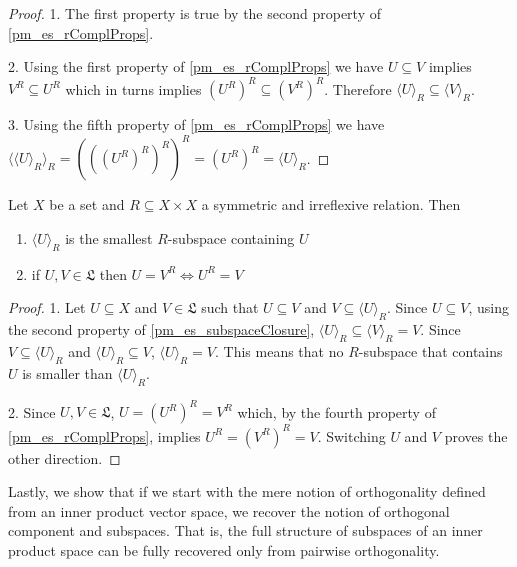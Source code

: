 \begin{mathSection}
	\begin{proof}
		1. The first property is true by the second property of \ref{pm_es_rComplProps}.
		
		2. Using the first property of \ref{pm_es_rComplProps} we have $U \subseteq V$ implies $V^{R} \subseteq U^{R}$ which in turns implies $(U^{R})^{R} \subseteq (V^{R})^{R}$. Therefore $\langle U \rangle_R \subseteq \langle V \rangle_R$.
		
		3. Using the fifth property of \ref{pm_es_rComplProps} we have $\langle \langle U \rangle_R \rangle_R = (((U^{R})^{R})^{R})^{R} = (U^{R})^{R} = \langle U \rangle_R$.
	\end{proof}
	
	\begin{prop}
		Let $X$ be a set and $R \subseteq X \times X$ a symmetric and irreflexive relation. Then
		\begin{enumerate}
			\item $\langle U \rangle_R$ is the smallest $R$-subspace containing $U$
			\item if $U, V \in \mathfrak{L}$ then $U = V^{R} \iff U^{R} = V$
		\end{enumerate}
	\end{prop}
	
	\begin{proof}
		1. Let $U \subseteq X$ and $V \in \mathfrak{L}$ such that $U \subseteq V$ and $V \subseteq \langle U \rangle_R$. Since $U \subseteq V$, using the second property of \ref{pm_es_subspaceClosure}, $\langle U \rangle_R \subseteq \langle V \rangle_R = V$. Since $V \subseteq \langle U \rangle_R$ and  $\langle U \rangle_R \subseteq  V$, $\langle U \rangle_R = V$. This means that no $R$-subspace that contains $U$ is smaller than $\langle U \rangle_R$.
		
		2. Since $U, V \in \mathfrak{L}$, $U = (U^{R})^{R} = V^{R}$ which, by the fourth property of \ref{pm_es_rComplProps}, implies $U^{R} = (V^{R})^{R} = V$. Switching $U$ and $V$ proves the other direction.
	\end{proof}
\end{mathSection}

Lastly, we show that if we start with the mere notion of orthogonality defined from an inner product vector space, we recover the notion of orthogonal component and subspaces. That is, the full structure of subspaces of an inner product space can be fully recovered only from pairwise orthogonality.

